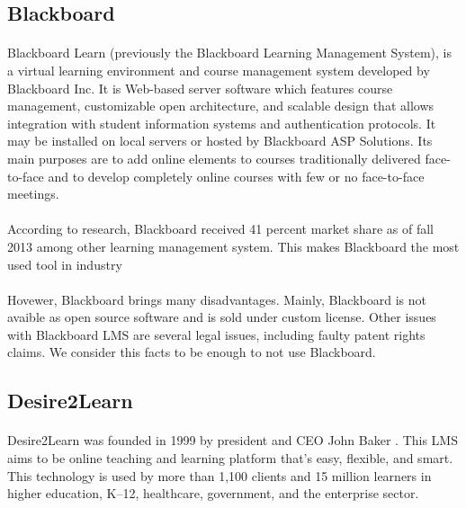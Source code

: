 \subsection{Blackboard}
\paragraph{}
Blackboard Learn (previously the Blackboard Learning Management System), is a virtual learning environment and course management system developed by Blackboard Inc. It is Web-based server software which features course management, customizable open architecture, and scalable design that allows integration with student information systems and authentication protocols. It may be installed on local servers or hosted by Blackboard ASP Solutions. Its main purposes are to add online elements to courses traditionally delivered face-to-face and to develop completely online courses with few or no face-to-face meetings. \cite{blackboard}

\paragraph{}
According to research, Blackboard received 41 percent market share as of fall 2013 among other learning management system. This makes Blackboard the most used tool in industry

\paragraph{}
Hovewer, Blackboard brings many disadvantages. Mainly, Blackboard is not avaible as open source software and is sold under custom license. Other issues with Blackboard LMS are several legal issues, including faulty patent rights claims. We consider this facts to be enough to not use Blackboard.

\subsection{Desire2Learn}
\paragraph{}
Desire2Learn was founded in 1999 by president and CEO John Baker \cite{d2l}. This LMS aims to be online teaching and learning platform that’s easy, flexible, and smart. This technology is used by more than 1,100 clients and 15 million learners in higher education, K–12, healthcare, government, and the enterprise sector.


